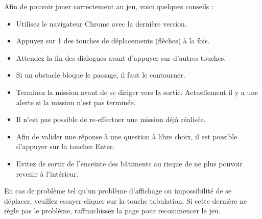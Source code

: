 Afin de pouvoir jouer correctement au jeu, voici quelques conseils :
\begin{itemize}
    \item Utilisez le navigateur Chrome avec la dernière version.
    \item Appuyez sur 1 des touches de déplacements (flèches) à la fois.
    \item Attendez la fin des dialogues avant d'appuyer sur d'autres touches.
    \item Si un obstacle bloque le passage, il faut le contourner.
    \item Terminez la mission avant de se diriger vers la sortie. Actuellement il y a une alerte si la mission n'est pas terminée.
    \item Il n'est pas possible de re-effectuer une mission déjà réalisée.
    \item Afin de valider une réponse à une question à libre choix, il est possible d'appuyer sur la toucher Enter.
    \item Evitez de sortir de l'enceinte des bâtiments au risque de ne plus pouvoir revenir à l'intérieur.
\end{itemize}

En cas de problème tel qu'un problème d'affichage ou impossibilité de se déplacer, veuillez essayer cliquer sur la touche tabulation. Si cette dernière ne règle pas le problème, raffraichissez la page pour recommencer le jeu.